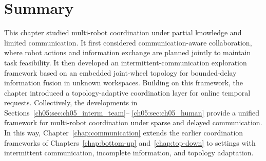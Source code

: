 \section{Summary}
\label{sec:ch05_summary}

This chapter studied multi-robot coordination under partial knowledge
and limited communication. It first considered communication-aware
collaboration, where robot actions and information exchange are planned
jointly to maintain task feasibility. It then developed an
intermittent-communication exploration framework based on an embedded
joint-wheel topology for bounded-delay information fusion in unknown
workspaces. Building on this framework, the chapter introduced a
topology-adaptive coordination layer for online temporal requests.
Collectively, the developments in
Sections~\ref{ch05:sec:ch05_interm_team}--
\ref{ch05:sec:ch05_human} provide a unified framework for multi-robot
coordination under sparse and delayed communication. In this way,
Chapter~\ref{chap:communication} extends the earlier coordination
frameworks of Chapters~\ref{chap:bottom-up} and~\ref{chap:top-down} to
settings with intermittent communication, incomplete information, and
topology adaptation.
